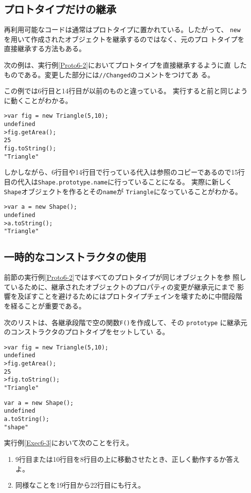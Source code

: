 \subsection{プロトタイプだけの継承}
再利用可能なコードは通常はプロトタイプに置かれている。したがって、
\verb+new+ を用いて作成されたオブジェクトを継承するのではなく、元のプロ
トタイプを直接継承する方法もある。
\begin{Exec}
\upshape
次の例は、実行例\ref{Proto6-2}においてプロトタイプを直接継承するように直
 したものである。変更した部分には\texttt{//Changed}のコメントをつけてあ
 る。

この例では6行目と14行目が以前のものと違っている。
実行すると前と同じように動くことがわかる。
\begin{verbatim}
>var fig = new Triangle(5,10);
undefined
>fig.getArea();
25
fig.toString();
"Triangle"
\end{verbatim}
しかしながら、6行目や14行目で行っている代入は参照のコピーであるので15行
 目の代入は\texttt{Shape.prototype.name}に行っていることになる。
実際に新しく\texttt{Shape}オブジェクトを作るとその\texttt{name}が
 \texttt{Triangle}になっていることがわかる。
\begin{verbatim}
>var a = new Shape();
undefined
>a.toString();
"Triangle"
\end{verbatim}
\end{Exec}
\subsection{一時的なコンストラクタの使用}
前節の実行例\ref{Proto6-2}ではすべてのプロトタイプが同じオブジェクトを参
照しているために、継承されたオブジェクトのプロパティの変更が継承元にまで
影響を及ぼすことを避けるためにはプロトタイプチェインを壊すために中間段階
を経ることが重要である。
\begin{Exec}\upshape\label{Exec6-3}
次のリストは、各継承段階で空の関数\texttt{F()}を作成して、その
 \texttt{prototype} に継承元のコンストラクタのプロトタイプをセットしてい
 る。
\begin{verbatim}
>var fig = new Triangle(5,10);
undefined
>fig.getArea();
25
>fig.toString();
"Triangle"
\end{verbatim}
\begin{verbatim}
var a = new Shape();
undefined
a.toString();
"shape"
\end{verbatim}
\end{Exec}
\begin{Prob}\upshape
実行例\ref{Exec6-3}において次のことを行え。
\begin{enumerate}
 \item 9行目または10行目を8行目の上に移動させたとき、正しく動作するか答えよ。
 \item 同様なことを19行目から22行目にも行え。
\iffalse
 \item 6行目から9行目と16行目から20行目までは同様の作業をしている。この
       部分を関数にしなさい。
\fi
\end{enumerate}
\end{Prob}
